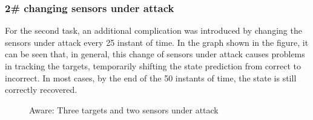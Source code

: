     \subsubsection*{2\# changing sensors under attack}
For the second task, an additional complication was introduced by changing the sensors under attack every 25 instant of time. In the graph shown in the figure, it can be seen that, in general, this change of sensors under attack causes problems in tracking the targets, temporarily shifting the state prediction from correct to incorrect. In most cases, by the end of the 50 instants of time, the state is still correctly recovered.
\begin{figure}[h]   
    \vspace{-1cm}
    \centering 
    \caption{Aware: Three targets and two sensors under attack}
    \label{fig:aware_3}
\end{figure}

